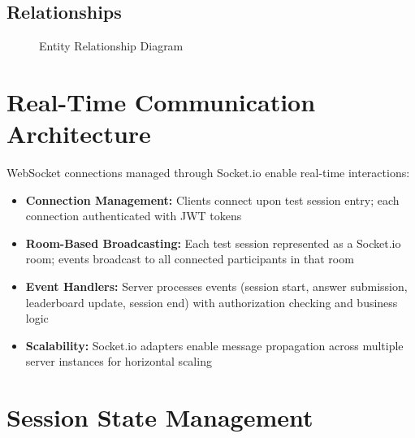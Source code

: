 \documentclass[12pt,a4paper]{report}
\begin{document}
\subsection{Relationships}

\begin{figure}[H]
  \centering
  \caption{Entity Relationship Diagram}
\end{figure}

\section{Real-Time Communication Architecture}

WebSocket connections managed through Socket.io enable real-time interactions:

\begin{itemize}[left=0pt]
  \item \textbf{Connection Management:} Clients connect upon test session entry; each connection authenticated with JWT tokens
  \item \textbf{Room-Based Broadcasting:} Each test session represented as a Socket.io room; events broadcast to all connected participants in that room
  \item \textbf{Event Handlers:} Server processes events (session start, answer submission, leaderboard update, session end) with authorization checking and business logic
  \item \textbf{Scalability:} Socket.io adapters enable message propagation across multiple server instances for horizontal scaling
\end{itemize}

\section{Session State Management}
\end{document}
